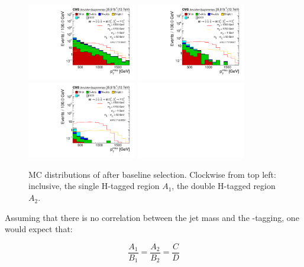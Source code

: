 \begin{figure}
\centering
\includegraphics[width=0.425\textwidth]{figs/MET_baseline_LogY.pdf}
\includegraphics[width=0.425\textwidth]{figs/MET_singleHiggsTag_LogY.pdf}
\includegraphics[width=0.425\textwidth]{figs/MET_doubleHiggsTag_LogY.pdf}
\includegraphics[width=0.425\textwidth]{figs/blankcanvas.pdf}
\caption[MC distributions of \ptmiss after baseline selection.]{MC distributions of \ptmiss after baseline selection. Clockwise from top left: inclusive, the single H-tagged region $A_{1}$, the double H-tagged region $A_{2}$.}
\label{fig:met}
\end{figure}

Assuming that there is no correlation between the jet mass and the \bbbar-tagging, one would expect that:

\begin{equation}
\frac{A_{1}}{B_{1}} = \frac{A_{2}}{B_{2}} = \frac{C}{D}
\end{equation}

